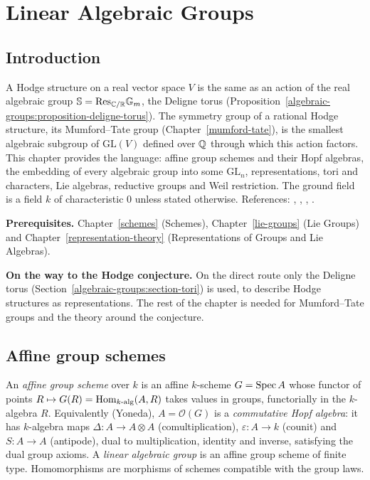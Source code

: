 \chapter{Linear Algebraic Groups}\label{algebraic-groups}

\section{Introduction}\label{algebraic-groups:section-introduction}

A Hodge structure on a real vector space $V$ is the same as an action of the real algebraic group $\mathbb{S} = \mathrm{Res}_{\mathbb{C}/\mathbb{R}}\mathbb{G}_m$, the
Deligne torus (Proposition~\ref{algebraic-groups:proposition-deligne-torus}). The symmetry group of a rational Hodge structure, its Mumford--Tate group
(Chapter~\ref{mumford-tate}), is the smallest algebraic subgroup of $\mathrm{GL}(V)$ defined over $\mathbb{Q}$ through which this action factors. This chapter provides
the language: affine group schemes and their Hopf algebras, the embedding of every algebraic group into some $\mathrm{GL}_n$, representations, tori and characters,
Lie algebras, reductive groups and Weil restriction. The ground field is a field $k$ of characteristic $0$ unless stated otherwise. References:
\cite{waterhouse-affine}, \cite{milne-algebraic-groups}, \cite{borel-lag}, \cite{deligne-milne}.

\noindent\textbf{Prerequisites.} Chapter~\ref{schemes} (Schemes), Chapter~\ref{lie-groups} (Lie Groups) and Chapter~\ref{representation-theory} (Representations of
Groups and Lie Algebras).

\noindent\textbf{On the way to the Hodge conjecture.} On the direct route only the Deligne torus (Section~\ref{algebraic-groups:section-tori}) is used, to describe Hodge structures as representations. The rest of the chapter is
needed for Mumford--Tate groups and the theory around the conjecture.

\section{Affine group schemes}\label{algebraic-groups:section-group-schemes}

\begin{definition}\label{algebraic-groups:definition-group-scheme}
An \emph{affine group scheme} over $k$ is an affine $k$-scheme $G = \operatorname{Spec} A$ whose functor of points $R \mapsto G(R) = \operatorname{Hom}_{k\text{-alg}}(A, R)$ takes values in groups,
functorially in the $k$-algebra $R$. Equivalently (Yoneda), $A = \mathcal{O}(G)$ is a \emph{commutative Hopf algebra}: it has $k$-algebra maps
$\Delta \colon A \to A \otimes A$ (comultiplication), $\varepsilon \colon A \to k$ (counit) and $S \colon A \to A$ (antipode), dual to multiplication, identity and inverse,
satisfying the dual group axioms. A \emph{linear algebraic group} is an affine group scheme of finite type. Homomorphisms are morphisms of schemes compatible with the
group laws.
\end{definition}

